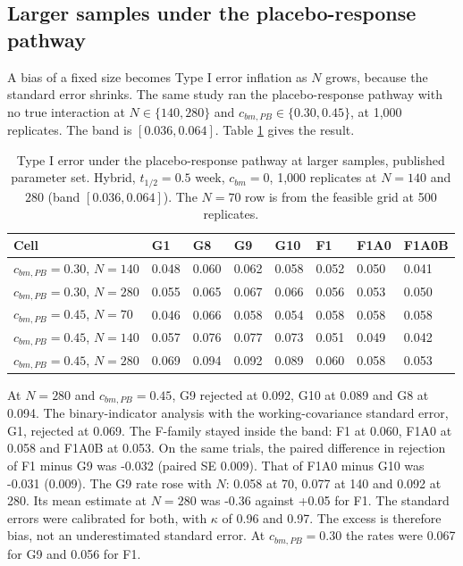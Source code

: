\documentclass[
  11pt,
]{article}
\begin{document}
\subsection{Larger samples under the placebo-response pathway}\label{sec-largen}

A bias of a fixed size becomes Type I error inflation as \(N\) grows,
because the standard error shrinks. The same study ran the
placebo-response pathway with no true interaction at \(N \in \{140,
280\}\) and \(c_{bm,PB} \in \{0.30, 0.45\}\), at 1,000
replicates. The band is \([0.036, 0.064]\). Table \ref{tab:tab-largen}
gives the result.

\begin{table}
\centering
\caption{\label{tab:tab-largen}Type I error under the placebo-response
      pathway at larger samples, published parameter set. Hybrid,
      $t_{1/2} = 0.5$ week, $c_{bm} = 0$, 1,000 replicates at $N = 140$
      and $280$ (band $[0.036, 0.064]$). The $N = 70$ row is from the feasible grid
      at 500 replicates.}
\centering
\fontsize{9}{11}\selectfont
\begin{tabular}[t]{llllllll}
\toprule
Cell & G1 & G8 & G9 & G10 & F1 & F1A0 & F1A0B\\
\midrule
$c_{bm,PB} = 0.30$, $N = 140$ & 0.048 & 0.060 & 0.062 & 0.058 & 0.052 & 0.050 & 0.041\\
$c_{bm,PB} = 0.30$, $N = 280$ & 0.055 & 0.065 & 0.067 & 0.066 & 0.056 & 0.053 & 0.050\\
$c_{bm,PB} = 0.45$, $N = 70$ & 0.046 & 0.066 & 0.058 & 0.054 & 0.058 & 0.058 & 0.058\\
$c_{bm,PB} = 0.45$, $N = 140$ & 0.057 & 0.076 & 0.077 & 0.073 & 0.051 & 0.049 & 0.042\\
$c_{bm,PB} = 0.45$, $N = 280$ & 0.069 & 0.094 & 0.092 & 0.089 & 0.060 & 0.058 & 0.053\\
\bottomrule
\end{tabular}
\end{table}

At \(N = 280\) and \(c_{bm,PB} = 0.45\), G9 rejected at
0.092, G10 at 0.089 and G8 at 0.094.
The binary-indicator analysis with the working-covariance standard
error, G1, rejected at
0.069. The F-family stayed inside the band: F1 at
0.060, F1A0 at 0.058 and F1A0B at
0.053. On the same trials, the paired difference in
rejection of F1 minus G9 was -0.032 (paired SE
0.009). That of F1A0 minus G10 was -0.031
(0.009). The G9 rate rose with \(N\):
0.058 at 70, 0.077 at 140 and
0.092 at 280. Its mean estimate at \(N = 280\) was
-0.36 against +0.05 for F1. The standard
errors were calibrated for both, with \(\kappa\) of 0.96 and
0.97. The excess is therefore bias, not an
underestimated standard error. At \(c_{bm,PB} = 0.30\) the rates were
0.067 for G9 and 0.056 for F1.
\end{document}
